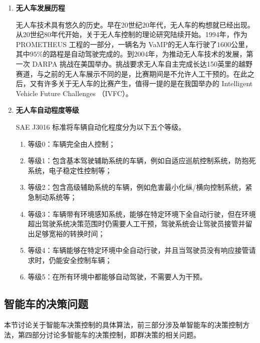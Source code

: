 \begin{enumerate}[wide=\parindent]
\item \textbf{无人车发展历程}

无人车技术具有悠久的历史。早在20世纪20年代，无人车的构想就已经出现\cite{Adrienne2016Your}。从20世纪80年代开始，关于无人车控制的理论研究陆续开始\cite{Dickmanns1988Dynamic}。1994年，作为 PROMETHEUS 工程\cite{eureka2016}的一部分，一辆名为 VaMP的无人车\cite{vamp2017}行驶了$1600$公里，其中$95\%$的路程是自动驾驶完成的。到2004年，为推动无人车技术的发展，第一次 DARPA 挑战在美国举办。挑战要求无人车自主完成长达150英里的越野赛道，与之前的无人车展示不同的是，比赛期间是不允许人工干预的。在此之后，又有许多关于无人车的比赛产生，值得一提的是在我国举办的 Intelligent Vehicle Future Challenges （IVFC）\cite{Xin2014China}。

\item \textbf{无人车自动程度等级}

SAE J3016 标准\cite{SO2014Taxonomy}将车辆自动化程度分为以下五个等级。
\begin{enumerate}[label=(\arabic*),wide=\parindent]
\item 等级0：车辆完全由人控制；

\item 等级1：包含基本驾驶辅助系统的车辆，例如自适应巡航控制系统，防抱死系统，电子稳定性控制\cite{Rajamani2011Vehicle}等；

\item 等级2：包含高级辅助系统的车辆，例如危害最小化纵/横向控制系统\cite{Gerdes2001A}，紧急制动系统\cite{Brannstrom2010Model,Vahidi2003Research}等；

\item 等级3：车辆带有环境感知系统，能够在特定环境下全自动行驶，但在环境超出驾驶系统决策范围时仍需要人工干预，驾驶系统会让驾驶员接管并留出足够宽裕的转换时间；

\item 等级4：车辆能够在特定环境中全自动行驶，并且当驾驶员没有响应接管请求时，仍能安全控制车辆；

\item 等级5：在所有环境中都能够自动驾驶，不需要人为干预。
\end{enumerate}
\end{enumerate}

\subsection{智能车的决策问题}
\label{sec:single}
本节讨论关于智能车决策控制的具体算法，前三部分涉及单智能车的决策控制方法，第四部分讨论多智能车的决策控制，即群决策的相关问题。\\

